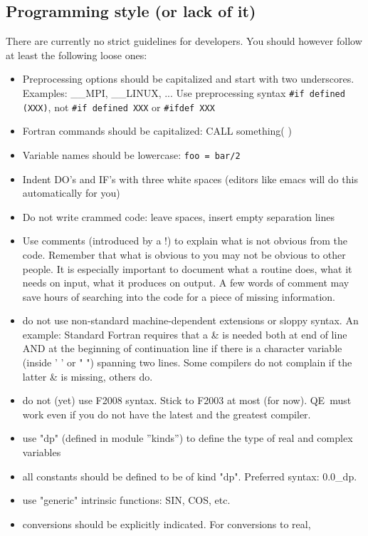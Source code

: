 \documentclass[12pt,a4paper]{article}
\def\qe{QE}
\begin{document}
\subsection{Programming style (or lack of it)}

There are currently no strict guidelines for developers. You
should however follow at least the following loose ones:
\begin{itemize}
\item Preprocessing options should be capitalized and start with
two underscores. Examples: \_\_MPI, \_\_LINUX, ... Use 
preprocessing syntax \verb|#if defined (XXX)|, not \verb|#if defined XXX|
or \verb|#ifdef XXX|
\item Fortran commands should be capitalized:
CALL something( )
\item Variable names should be lowercase: \texttt{foo = bar/2}
\item Indent DO's and IF's with three white spaces (editors like emacs will do this automatically for you)
\item Do not write crammed code: leave spaces, insert empty separation lines
\item Use comments (introduced by a !) to explain what is not obvious from
the code. Remember that what is obvious to you may not be obvious to other
people. It is especially important to document what a routine does, what
it needs on input, what it produces on output. A few words of comment
may save hours of searching into the code for a piece of missing information.
\item do not use non-standard machine-dependent extensions or sloppy syntax.
  An example: Standard Fortran requires that a \& is needed both at end of
  line AND at the beginning of continuation line if there is a character
  variable (inside ' ' or " ") spanning two lines. Some compilers do not
  complain if the latter \& is missing, others do.
\item do not (yet) use F2008 syntax. Stick to F2003 at most (for now).
  \qe\ must work even if you do not have the latest and the greatest compiler.
\item use "dp" (defined in module ''kinds'') to define the type of real and
  complex variables
\item all constants should be defined to be of kind "dp".  Preferred syntax:
  0.0\_dp.
\item use "generic" intrinsic functions: SIN, COS, etc.
\item conversions should be explicitly indicated. For conversions to real,

\end{itemize}
\end{document}
